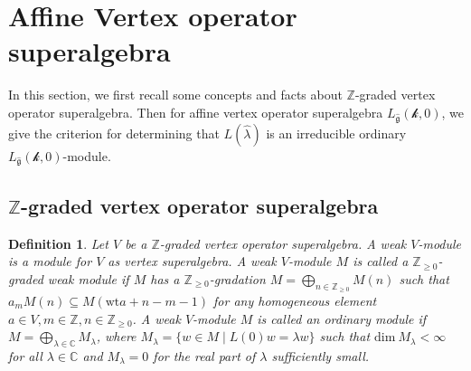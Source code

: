 \documentclass[12pt]{article}
\newtheorem{defi}[thm]{Definition}
\begin{document}
\section{Affine Vertex operator superalgebra}
\label{sec:3}
	\def\theequation{3.\arabic{equation}}
	\setcounter{equation}{0}
In this section, we first recall some concepts and facts about $\mathbb{Z}$-graded vertex operator superalgebra.
Then for affine vertex operator superalgebra $L_{\widehat{\mathfrak{g}}}(\mathcal{k},0)$,
we give the criterion for determining that $L(\hat{\lambda})$ is an irreducible ordinary $L_{\widehat{\mathfrak{g}}}(\mathcal{k},0)$-module.


\subsection{$\mathbb{Z}$-graded vertex operator superalgebra}
\begin{defi}
{\em  Let $V$ be a $\mathbb{Z}$-graded vertex operator superalgebra.
A {\em weak $V$-module} is a module for $V$ as vertex superalgebra.
A weak $V$-module $M$ is called a {\em $\mathbb{Z}_{\geq 0}$-graded} {\em weak module}
if $M$ has a $\mathbb{Z}_ {\geq 0}$-gradation $M=\bigoplus_{n\in\mathbb{Z}_{\geq 0}}M(n)$ such that
$a_mM(n)\subseteq M(\mbox{wt}a+n-m-1)$
for any homogeneous element $a\in V, m\in\mathbb{Z}, n\in\mathbb{Z}_{\geq 0}$.
A weak $V$-module $M$ is called an {\em ordinary module}
if $M=\bigoplus_{\lambda\in\mathbb{C}}M_{\lambda}$, where $M_{\lambda}=\{w\in M \mid L(0)w=\lambda w\}$ such that
$\mbox{dim}~M_{\lambda}<\infty$ for all $\lambda\in\mathbb{C}$ and
$M_{\lambda}=0$ for the real part of $\lambda$ sufficiently small.}
\end{defi}
\end{document}
